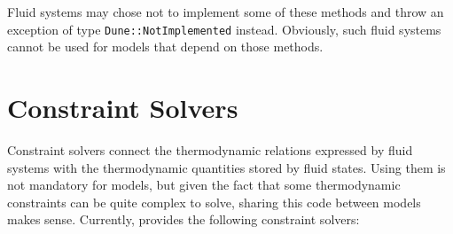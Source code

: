 Fluid systems may chose not to implement some of these methods and
throw an exception of type \lstinline{Dune::NotImplemented} instead. Obviously,
such fluid systems cannot be used for models that depend on those
methods.

\section{Constraint Solvers}
\label{sec:constraint_solvers}

Constraint solvers connect the thermodynamic relations expressed by
fluid systems with the thermodynamic quantities stored by fluid
states. Using them is not mandatory for models, but given the fact
that some thermodynamic constraints can be quite complex to solve,
sharing this code between models makes sense. Currently, \eWoms
provides the following constraint solvers:

